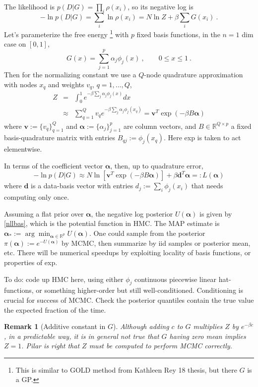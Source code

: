 \documentclass[10pt]{article}
\newcommand{\be}{\begin{equation}}
\newcommand{\ee}{\end{equation}}
\newcommand{\bea}{\begin{eqnarray}}
\newcommand{\eea}{\end{eqnarray}}
\newcommand{\mbf}[1]{{\mathbf #1}}
\newcommand{\R}{\mathbb{R}}
\newtheorem{rmk}[thm]{Remark}
\newcommand{\al}{\alpha}
\newcommand{\bt}{\beta}
\newcommand{\bal}{{\bm\alpha}}
\begin{document}
The likelihood is $p(D|G) = \prod_i \rho(x_i)$, so its negative log is
\be
-\ln p(D|G) = \sum_i \ln \rho(x_i) = N \ln Z + \bt \sum_i G(x_i)~.
\label{nll}
\ee
Let's parameterize the free energy
\footnote{This is similar to GOLD method from Kathleen Rey 18 thesis, but
  there $G$ is a GP.}
with $p$ fixed basis functions,
in the $n=1$ dim case on $[0,1]$,
\be
G(x) = \sum_{j=1}^p \al_j \phi_j(x)~,\qquad  0\le x \le 1~.
\label{basis}
\ee
Then
for the normalizing constant
we use a $Q$-node quadrature approximation
with nodes $x_q$ and weights $v_q$, $q=1,\dots,Q$,
\bea
Z &= &\int_0^1 e^{-\bt \sum_j \al_j \phi_j(x)} dx
\label{Z1}
\\
&\approx&
\sum_{q=1}^Q v_q e^{-\bt \sum_j \al_j \phi_j(x_q)} = 
\mbf{v}^T \exp (-\bt B \bal)
\eea
where $\mbf{v} := \{v_q\}_{q=1}^Q$
and $\bal := \{\al_j\}_{j=1}^p$
are column vectors, and
$B \in \R^{Q\times p}$ a fixed basis-quadrature matrix with entries
$B_{qj}:= \phi_j(x_q)$. Here exp is taken to act elementwise.

In terms of the coefficient vector $\bal$, then, up to quadrature
error,
\be
- \ln p(D|G) \approx
N \ln [\mbf{v}^T \exp (-\bt B \bal)]
+ \bt \mbf{d}^T \bal
\label{nllbas}
=: L(\bal)
\ee
where $\mbf{d}$ is a data-basis vector with entries
$d_j := \sum_i \phi_j(x_i)$ that needs computing only once.

Assuming a flat prior over $\bal$, the negative log posterior $U(\bal)$
is given by \eqref{nllbas}, which is the potential function in HMC.
The MAP estimate is $\bal_*:=\arg\min_{\bal\in\R^p} U(\bal)$.
One could sample from the posterior $\pi(\bal):=e^{-U(\bal)}$ by MCMC,
then summarize by iid samples or posterior mean, etc.
There will be numerical speedups by exploiting locality of
basis functions, or properties of exp.

To do: code up HMC here, using either $\phi_j$ continuous piecewise
linear hat-functions, or something higher-order but still well-conditioned.
Conditioning is crucial for success of MCMC.
Check the posterior quantiles contain the true value the expected fraction
of the time.

\begin{rmk}[Additive constant in $G$]
  Although adding $c$ to $G$ multiplies $Z$ by $e^{-\bt c}$, in a predictable way,
  it is in general not true that $G$ having zero mean implies $Z=1$.
  Pilar is right that $Z$ must be computed to perform MCMC correctly.
  \end{rmk}




\end{document}
